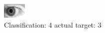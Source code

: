 \begin{figure}[h!]
\begin{center}
\includegraphics[width=0.60\columnwidth]{figures/ID236_class_4_target_3.png}
\end{center}
\caption{ Classification: 4 actual target: 3}
\label{fig:ID236_class_4_target_3}
\end{figure}
